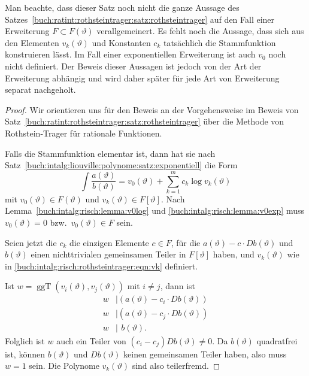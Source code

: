 Man beachte, dass dieser Satz noch nicht die ganze Aussage des
Satzes~\ref{buch:ratint:rothsteintrager:satz:rothsteintrager} auf den
Fall einer Erweiterung $F\subset F(\vartheta)$ verallgemeinert.
Es fehlt noch die Aussage, dass sich aus den Elementen $v_k(\vartheta)$
und Konstanten $c_k$ tatsächlich die Stammfunktion konstruieren lässt.
Im Fall einer exponentiellen Erweiterung ist auch $v_0$ noch nicht definiert.
Der Beweis dieser Aussagen ist jedoch von der Art der Erweiterung abhängig
und wird daher später für jede Art von Erweiterung separat nachgeholt.

\begin{proof}
Wir orientieren uns für den Beweis an der Vorgehensweise im Beweis von
Satz~\ref{buch:ratint:rothsteintrager:satz:rothsteintrager} über die
Methode von Rothstein-Trager für rationale Funktionen.

Falls die Stammfunktion elementar ist, dann hat sie nach 
Satz~\ref{buch:intalg:liouville:polynome:satz:exponentiell}
die Form
\[
\int \frac{a(\vartheta)}{b(\vartheta)}
=
v_0(\vartheta)
+
\sum_{k=1}^m c_k\log v_k(\vartheta)
\]
mit $v_0(\vartheta)\in F(\vartheta)$ und $v_k(\vartheta)\in F[\vartheta]$.
Nach Lemma~\ref{buch:intalg:risch:lemma:v0log} und
\ref{buch:intalg:risch:lemma:v0exp}
muss $v_0(\vartheta)=0$ bzw.~$v_0(\vartheta)\in F$ sein.

Seien jetzt die $c_k$ die einzigen Elemente $c\in F$, für die
$a(\vartheta)-c\cdot Db(\vartheta)$ und $b(\vartheta)$ einen nichttrivialen
gemeinsamen Teiler in $F[\vartheta]$ haben, und $v_k(\vartheta)$ wie in
\eqref{buch:intalg:risch:rothsteintrager:eqn:vk} definiert.

Ist $w=\operatorname{ggT}(v_i(\vartheta),v_j(\vartheta))$ mit $i\ne j$, dann
ist 
\begin{align*}
w&\mid (a(\vartheta)-c_i\cdot Db(\vartheta))\\
w&\mid (a(\vartheta)-c_j\cdot Db(\vartheta))\\
w&\mid \phantom{(}b(\vartheta).\phantom{)}
\end{align*}
Folglich ist $w$ auch ein Teiler von $(c_i-c_j) Db(\vartheta)\ne 0$.
Da $b(\vartheta)$ quadratfrei ist, können $b(\vartheta)$ und $Db(\vartheta)$
keinen gemeinsamen Teiler haben, also muss $w=1$ sein.
Die Polynome $v_k(\vartheta)$ sind also teilerfremd.


\end{proof}
